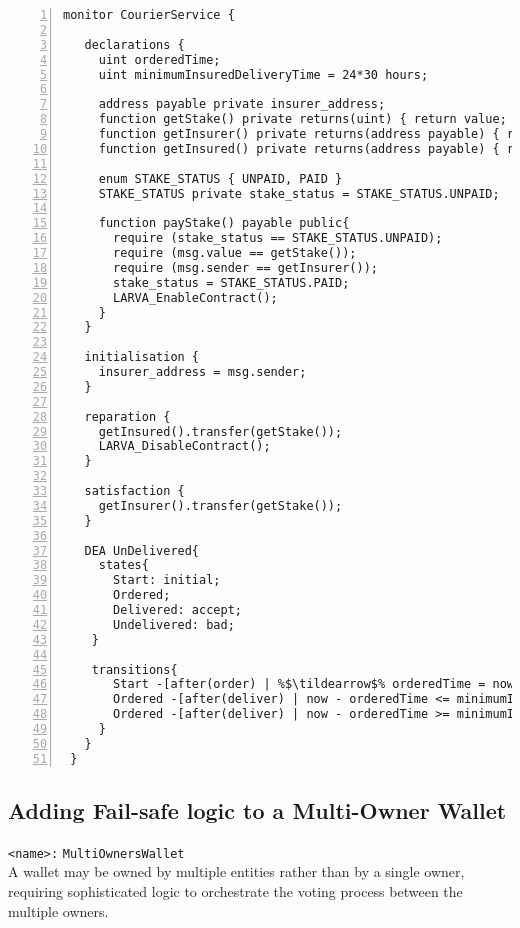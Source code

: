 \documentclass{article}
\newcommand{\tildearrow}{{\raise.37ex\hbox{$\scriptstyle\mathtt{\sim}$}}\hspace{-0.08cm}>\xspace}
\begin{document}
  \small\begin{lstlisting}[language=DEA,basicstyle=\scriptsize,numbers=left,numbersep=2pt,xleftmargin=0.3cm,escapechar=\%,label={dea:insurancecourier}]
 monitor CourierService {
 
   declarations {
     uint orderedTime;
     uint minimumInsuredDeliveryTime = 24*30 hours;
 
     address payable private insurer_address;
     function getStake() private returns(uint) { return value; }
     function getInsurer() private returns(address payable) { return insurer_address; }
     function getInsured() private returns(address payable) { return customer; }
 
     enum STAKE_STATUS { UNPAID, PAID }
     STAKE_STATUS private stake_status = STAKE_STATUS.UNPAID;
 
     function payStake() payable public{
       require (stake_status == STAKE_STATUS.UNPAID);
       require (msg.value == getStake());
       require (msg.sender == getInsurer());
       stake_status = STAKE_STATUS.PAID;
       LARVA_EnableContract();
     }
   }
 
   initialisation {
     insurer_address = msg.sender;
   }
 
   reparation {
     getInsured().transfer(getStake());
     LARVA_DisableContract();
   }
 
   satisfaction {
     getInsurer().transfer(getStake());
   }
 
   DEA UnDelivered{
     states{
       Start: initial;
       Ordered;
       Delivered: accept;
       Undelivered: bad;
    }
 
    transitions{
       Start -[after(order) | %$\tildearrow$% orderedTime = now;]-> Ordered;
       Ordered -[after(deliver) | now - orderedTime <= minimumInsuredDeliveryTime]-> Delivered;
       Ordered -[after(deliver) | now - orderedTime >= minimumInsuredDeliveryTime]-> Undelivered;
     }
   }
 }
 \end{lstlisting}\normalsize
 
 
 \subsection{Adding Fail-safe logic to a Multi-Owner Wallet} 
         \texttt{<name>:} \verb+MultiOwnersWallet+\\

A wallet may be owned by multiple entities rather than by a single owner, requiring sophisticated logic to orchestrate the voting process between the multiple owners.
\end{document}

